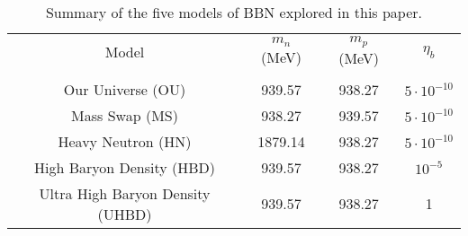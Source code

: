 \documentclass[aps,reprint,prl]{revtex4-1}
\begin{document}
\begin{table}[h]
\begin{tabular}{c|c|c|c}
Model                     & $m_n$ (MeV) & $m_p$ (MeV) & $\eta_b$         \\
                          &             &             &                  \\ \hline
Our Universe (OU)             & 939.57      & 938.27      & $5\cdot10^{-10}$ \\ \hline
Mass Swap (MS)                 & 938.27      & 939.57      & $5\cdot10^{-10}$ \\ \hline
Heavy Neutron (HN)            & 1879.14     & 938.27      & $5\cdot10^{-10}$ \\ \hline
High Baryon Density (HBD)       & 939.57      & 938.27      & $10^{-5}$        \\ \hline
Ultra High Baryon Density (UHBD) & 939.57      & 938.27      & 1               
\end{tabular}
\caption{Summary of the five models of BBN explored in this paper.}
\end{table}
\end{document}
